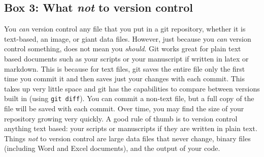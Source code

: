 \subsection{Box 3: What \textit{not} to version control}

You \textit{can} version control any file that you put in a git repository, whether it is text-based, an image, or giant data files. However, just because you \textit{can} version control something, does not mean you \textit{should}. Git works great for plain text based documents such as your scripts or your manuscript if written in latex or markdown. This is because for text files, git saves the entire file only the first time you commit it and then saves just your changes with each commit. This takes up very little space and git has the capabilities to compare between versions built in (using \verb|git diff|). You can commit a non-text file, but a full copy of the file will be saved with each commit. Over time, you may find the size of your repository growing very quickly. A good rule of thumb is to version control anything text based: your scripts or manuscripts if they are written in plain text. Things \textit{not} to version control are large data files that never change, binary files (including Word and Excel documents), and the output of your code. 
